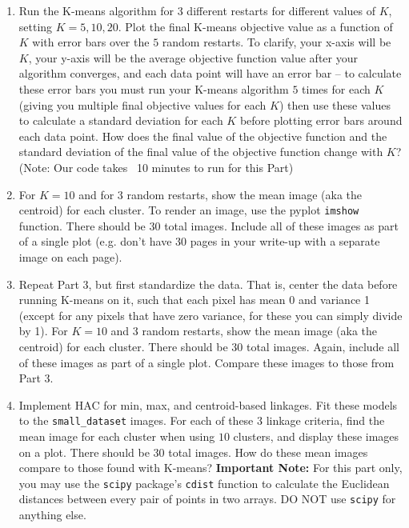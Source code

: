 \documentclass[submit]{harvardml}
\begin{document}
\begin{problem}
\begin{enumerate}
\item Run the K-means algorithm for 3 different restarts for different
  values of $K$, setting $K = 5, 10, 20$. Plot the final K-means objective value as a function
  of $K$ with error bars over the $5$ random restarts. To clarify, your
  x-axis will be $K$, your y-axis will be the average objective function value
  after your algorithm converges, and each data point will have an
  error bar -- to calculate these error bars you must run your K-means
  algorithm $5$ times for each $K$ (giving you multiple final objective values
  for each $K$) then use these values to calculate a standard deviation for
  each $K$ before plotting error bars around each data point. How
  does the final value of the objective function and the standard deviation of the final
  value of the objective function change with $K$? (Note: Our code takes ~10 minutes to run for this Part)
  
\item For $K=10$ and for 3 random restarts, show the mean
  image (aka the centroid) for each cluster.
  To render an image, use the pyplot
  \texttt{imshow} function. There should be 30 total images. Include all of these images
  as part of a single plot (e.g. don't have 30 pages in your write-up with a
  separate image on each page).

\item Repeat Part 3, but first standardize the data. That is, center
  the data before running K-means on it, such that each pixel has mean 0 and variance 1 (except
  for any pixels that have zero variance, for these you can simply
  divide by 1). For $K=10$ and 3 random restarts, show the mean image
  (aka the centroid) for each cluster. There should be 30 total
  images. Again, include all of these images as part of a single plot.
  Compare these images to those from Part 3.

\item Implement HAC for min, max, and centroid-based linkages. Fit these models to the \texttt{small\_dataset} images. 
  For each of these 3 linkage criteria, find the mean image for each cluster when using $10$ clusters, and display these images on a plot. There should be 30 total images.
  How do these mean images compare to those found with K-means? \textbf{Important Note:} For this part only, you may use the \texttt{scipy} package's \texttt{cdist} function to calculate the Euclidean distances between every pair of points in two arrays. DO NOT use \texttt{scipy} for anything else. 


\end{enumerate}
\end{problem}
\end{document}
